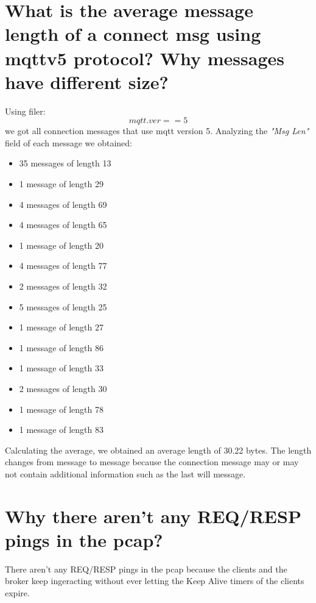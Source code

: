 \documentclass{article}
\begin{document}
\section{What is the average message length of a connect msg
using mqttv5 protocol? Why messages have different
size?}
Using filer: \[ mqtt.ver == 5\] we got all connection messages that use mqtt version 5. \hfill \break
Analyzing the \textit{"Msg Len"} field of each message we obtained: 
\begin{itemize} 
   \item 35 messages of length 13
   \item 1 message of length 29
   \item 4 messages of length 69
   \item 4 messages of length 65
   \item 1 message of length 20
   \item 4 messages of length 77
   \item 2 messages of length 32
   \item 5 messages of length 25
   \item 1 message of length 27
   \item 1 message of length 86
   \item 1 message of length 33
   \item 2 messages of length 30
   \item 1 message of length 78
   \item 1 message of length 83
\end{itemize}
Calculating the average, we obtained an average length of 30.22 bytes. \hfill \break
The length changes from message to message because the connection message may or may not contain additional information such as the last will message.

\section{Why there aren’t any REQ/RESP pings in the pcap?}
There aren't any REQ/RESP pings in the pcap because the clients and the broker keep ingeracting without ever letting the Keep Alive timers of the clients expire.
\end{document}
